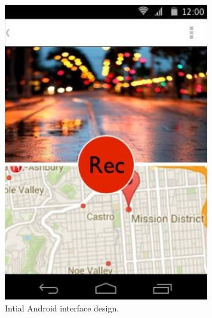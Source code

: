 \documentclass{l3proj}
\begin{document}
\newpage
\begin{figure}[ht!]
\centering
\includegraphics[width=0.8\textwidth]{images/android-digital-prototype-1.jpg}
\caption{Intial Android interface design.}
\end{figure}
\end{document}
